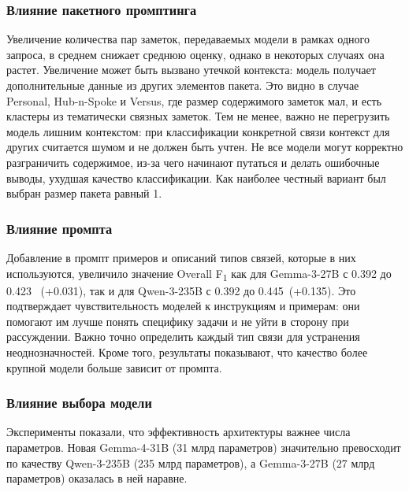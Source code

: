 \subsubsection*{Влияние пакетного промптинга}
Увеличение количества пар заметок, передаваемых модели в рамках одного запроса,
в среднем снижает среднюю оценку, однако в некоторых случаях она растет.
Увеличение может быть вызвано утечкой контекста:
модель получает дополнительные данные из других элементов пакета.
Это видно в случае Personal, Hub-n-Spoke и Versus, где размер содержимого заметок мал,
и есть кластеры из тематически связных заметок.
Тем не менее, важно не перегрузить модель лишним контекстом: при классификации конкретной связи
контекст для других считается шумом и не должен быть учтен. Не все модели могут корректно
разграничить содержимое, из-за чего начинают путаться и делать ошибочные выводы, ухудшая качество классификации.
Как наиболее честный вариант был выбран размер пакета равный 1.

\subsubsection*{Влияние промпта}
Добавление в промпт примеров и описаний типов связей, которые в них используются,
увеличило значение Overall F\textsubscript{1} как для Gemma-3-27B с 0.392 до 0.423 ~(+0.031),
так и для Qwen-3-235B с 0.392 до 0.445~(+0.135).
Это подтверждает чувствительность моделей
к инструкциям и примерам: они помогают им лучше понять специфику задачи
и не уйти в сторону при рассуждении.
Важно точно определить каждый тип связи для устранения неоднозначностей.
Кроме того, результаты показывают,
что качество более крупной модели больше зависит от промпта.

\subsubsection*{Влияние выбора модели}
Эксперименты показали, что
эффективность архитектуры важнее числа параметров.
Новая Gemma-4-31B (31 млрд параметров) значительно превосходит
по качеству Qwen-3-235B (235 млрд параметров),
а Gemma-3-27B (27 млрд параметров) оказалась в ней наравне.


